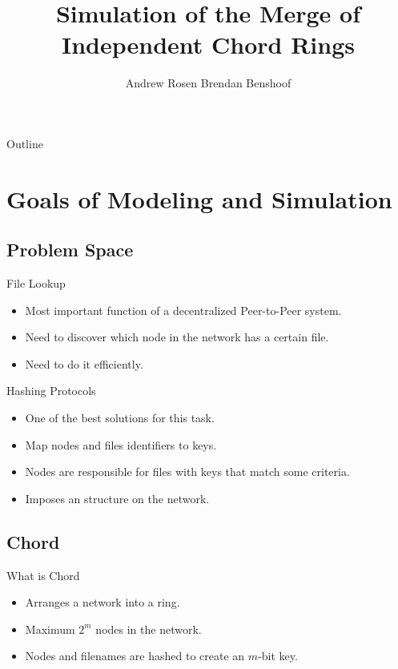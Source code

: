 \documentclass{beamer}
\title{Simulation of the Merge of Independent Chord Rings}
\author{Andrew Rosen \qquad Brendan Benshoof }
\date{} %
\begin{document}
\begin{frame}
  \titlepage
\end{frame}

\begin{frame}{Outline}
  \tableofcontents
\end{frame}

\section{Goals of Modeling and Simulation}

\subsection{Problem Space}

\begin{frame}{File Lookup}
	\begin{itemize}
		\item Most important function of a decentralized Peer-to-Peer system.
		\item Need to discover which node in the network has a certain file.
		\item Need to do it efficiently.
	\end{itemize}

\end{frame}


\begin{frame}{Hashing Protocols}
	\begin{itemize}
		\item One of the best solutions for this task.
		\item Map nodes and files identifiers to keys.
		\item Nodes are responsible for files with keys that match some criteria.
		\item Imposes an structure on the network.
	\end{itemize}

\end{frame}


\subsection{Chord}

\begin{frame}{What is Chord}
	\begin{itemize}
		\item Arranges a network into a ring.
		\item Maximum $2^m$ nodes in the network.
		\item Nodes and filenames are hashed to create an $m$-bit key.
	\end{itemize}

\end{frame}
\end{document}
